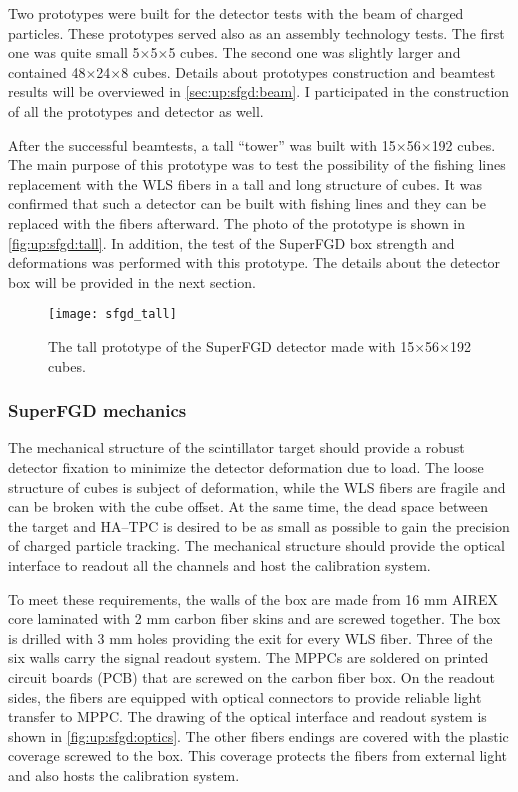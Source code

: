 \documentclass[main.tex]{subfiles}
\begin{document}
Two prototypes were built for the detector tests with the beam of charged particles. These prototypes served also as an assembly technology tests. The first one was quite small 5$\times$5$\times$5 cubes. The second one was slightly larger and contained 48$\times$24$\times$8 cubes. Details about prototypes construction and beamtest results will be overviewed in \autoref{sec:up:sfgd:beam}. I participated in the construction of all the prototypes and detector as well.

After the successful beamtests, a tall ``tower'' was built with 15$\times$56$\times$192 cubes. The main purpose of this prototype was to test the possibility of the fishing lines replacement with the WLS fibers in a tall and long structure of cubes. It was confirmed that such a detector can be built with fishing lines and they can be replaced with the fibers afterward. The photo of the prototype is shown in \autoref{fig:up:sfgd:tall}. In addition, the test of the SuperFGD box strength and deformations was performed with this prototype. The details about the detector box will be provided in the next section.

\begin{figure}[!ht]
	\centering
	\texttt{[image: sfgd\_tall]}
	\caption{The tall prototype of the SuperFGD detector made with 15$\times$56$\times$192 cubes.}
	\label{fig:up:sfgd:tall}
\end{figure}

\subsubsection{SuperFGD mechanics}
The mechanical structure of the scintillator target should provide a robust detector fixation to minimize the detector deformation due to load. The loose structure of cubes is subject of deformation, while the WLS fibers are fragile and can be broken with the cube offset. At the same time, the dead space between the target and HA--TPC is desired to be as small as possible to gain the precision of charged particle tracking. The mechanical structure should provide the optical interface to readout all the channels and host the calibration system.

To meet these requirements, the walls of the box are made from 16 mm AIREX core laminated with 2 mm carbon fiber skins and are screwed together. The box is drilled with 3 mm holes providing the exit for every WLS fiber. Three of the six walls carry the signal readout system. The MPPCs are soldered on printed circuit boards (PCB) that are screwed on the carbon fiber box. On the readout sides, the fibers are equipped with optical connectors to provide reliable light transfer to MPPC. The drawing of the optical interface and readout system is shown in \autoref{fig:up:sfgd:optics}. The other fibers endings are covered with the plastic coverage screwed to the box. This coverage protects the fibers from external light and also hosts the calibration system.
\end{document}
